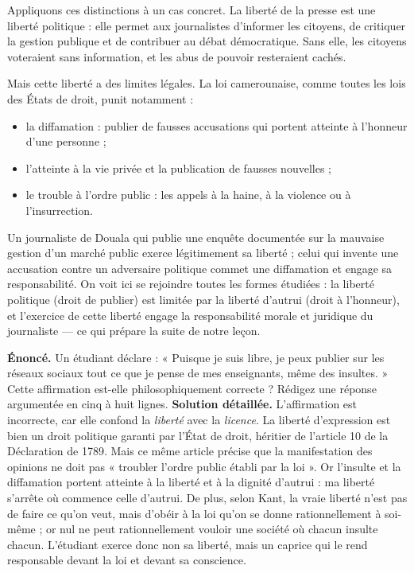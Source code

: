 \documentclass[11pt]{article}
\newcommand{\cle}[1]{{\popxbold\color{popdark}#1}}
\newcounter{popsec}
\newcounter{popsub}
\newcommand{\courssub}[1]{%
  \stepcounter{popsub}%
  \par\vspace{9pt}\noindent{\popxbold\fontsize{11.5}{13}\selectfont\color{popink}{\color{poporange}\thepopsec.\thepopsub}\hspace{6pt}#1}\par\nopagebreak\vspace{4pt}
}
\begin{document}
\courssub{Étude de cas : la liberté de la presse au Cameroun}

Appliquons ces distinctions à un cas concret. La \cle{liberté de la presse} est une liberté politique : elle permet aux journalistes d'informer les citoyens, de critiquer la gestion publique et de contribuer au débat démocratique. Sans elle, les citoyens voteraient sans information, et les abus de pouvoir resteraient cachés.

Mais cette liberté a des \cle{limites légales}. La loi camerounaise, comme toutes les lois des États de droit, punit notamment :
\begin{itemize}
\item la \cle{diffamation} : publier de fausses accusations qui portent atteinte à l'honneur d'une personne ;
\item l'atteinte à la vie privée et la publication de fausses nouvelles ;
\item le \cle{trouble à l'ordre public} : les appels à la haine, à la violence ou à l'insurrection.
\end{itemize}

Un journaliste de Douala qui publie une enquête documentée sur la mauvaise gestion d'un marché public exerce légitimement sa liberté ; celui qui invente une accusation contre un adversaire politique commet une diffamation et engage sa responsabilité. On voit ici se rejoindre toutes les formes étudiées : la liberté politique (droit de publier) est limitée par la liberté d'autrui (droit à l'honneur), et l'exercice de cette liberté engage la responsabilité morale et juridique du journaliste — ce qui prépare la suite de notre leçon.

\begin{exoresolu}
\textbf{Énoncé.} Un étudiant déclare : « Puisque je suis libre, je peux publier sur les réseaux sociaux tout ce que je pense de mes enseignants, même des insultes. » Cette affirmation est-elle philosophiquement correcte ? Rédigez une réponse argumentée en cinq à huit lignes.
\tcblower
\textbf{Solution détaillée.} L'affirmation est incorrecte, car elle confond la \emph{liberté} avec la \emph{licence}. La liberté d'expression est bien un droit politique garanti par l'État de droit, héritier de l'article 10 de la Déclaration de 1789. Mais ce même article précise que la manifestation des opinions ne doit pas « troubler l'ordre public établi par la loi ». Or l'insulte et la diffamation portent atteinte à la liberté et à la dignité d'autrui : ma liberté s'arrête où commence celle d'autrui. De plus, selon Kant, la vraie liberté n'est pas de faire ce qu'on veut, mais d'obéir à la loi qu'on se donne rationnellement à soi-même ; or nul ne peut rationnellement vouloir une société où chacun insulte chacun. L'étudiant exerce donc non sa liberté, mais un caprice qui le rend responsable devant la loi et devant sa conscience.
\end{exoresolu}
\end{document}
